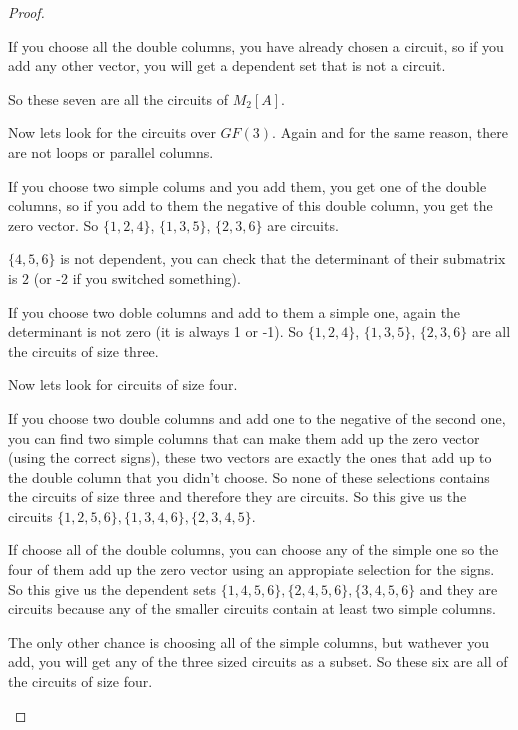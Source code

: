 \begin{proof}
\begin{enumerate}[label=(\roman*)]
            If you choose all the double columns, you have already chosen a circuit, so if you add any other vector,
            you will get a dependent set that is not a circuit.\pn
            
            So these seven are all the circuits of $M_2[A]$.\pn
            
            Now lets look for the circuits over $GF(3)$. Again and for the same reason, there are not loops or parallel columns.\pn
            
            If you choose two simple colums and you add them, you get one of the double columns, so if you add to them the
            negative of this double column, you get the zero vector. So $\{1, 2, 4\}$, $\{1, 3, 5\}$, $\{2, 3, 6\}$ are
            circuits.\pn
            
            $\{4, 5, 6\}$ is not dependent, you can check that the determinant of their submatrix is $2$ (or -2 if you switched
            something).\pn
            
            If you choose two doble columns and add to them a simple one, again the determinant is not zero (it is always 1 or -1).
            So $\{1, 2, 4\}$, $\{1, 3, 5\}$, $\{2, 3, 6\}$ are all the circuits of size three.\pn
            
            Now lets look for circuits of size four.\pn
            
            If you choose two double columns and add one to the negative of the second one, you can find two simple columns that 
            can make them add up the zero vector (using the correct signs), these two vectors are exactly the ones that add up to
            the double column that you didn't choose. So none of these selections contains the circuits of size three and therefore
            they are circuits. So this give us the circuits $\{1, 2, 5, 6\}, \{1, 3, 4, 6\}, \{2, 3, 4, 5\}$.\pn
            
            If choose all of the double columns, you can choose any of the simple one so the four of them add up the zero vector using
            an appropiate selection for the signs. So this give us the dependent sets $\{1, 4, 5, 6\}, \{2, 4, 5, 6\}, \{3, 4, 5, 6\}$ 
            and they are circuits because any of the smaller circuits contain at least two simple columns.\pn
            
            The only other chance is choosing all of the simple columns, but wathever you add, you will get any of the three sized
            circuits as a subset. So these six are all of the circuits of size four.\pn
            

\end{enumerate}
\end{proof}
